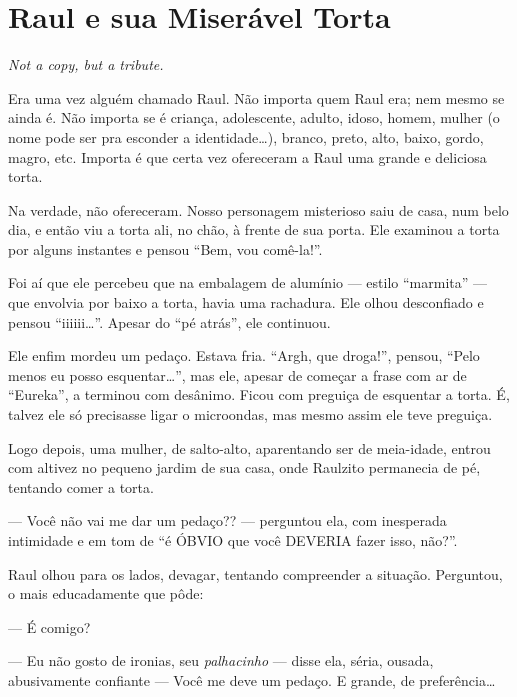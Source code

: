 \chapter{Raul e sua Miserável Torta}

\begin{flushright}
\foreignlanguage{english}{\emph{Not a copy, but a tribute.}}
\end{flushright}

Era uma vez alguém chamado Raul. Não importa quem Raul era; nem mesmo se ainda é. Não importa se é criança, adolescente, adulto, idoso, homem, mulher (o nome pode ser pra esconder a identidade\ldots), branco, preto, alto, baixo, gordo, magro, etc. Importa é que certa vez ofereceram a Raul uma grande e deliciosa torta.

Na verdade, não ofereceram. Nosso personagem misterioso saiu de casa, num belo dia, e então viu a torta ali, no chão, à frente de sua porta. Ele examinou a torta por alguns instantes e pensou ``Bem, vou comê-la!''.

Foi aí que ele percebeu que na embalagem de alumínio --- estilo ``marmita'' --- que envolvia por baixo a torta, havia uma rachadura. Ele olhou desconfiado e pensou ``iiiiii\ldots''. Apesar do ``pé atrás'', ele continuou.

\begin{sloppypar}
Ele enfim mordeu um pedaço. Estava fria. ``Argh, que droga!'', pensou, ``Pelo menos eu posso esquentar\ldots'', mas ele, apesar de começar a frase com ar de ``Eureka'', a terminou com desânimo. Ficou com preguiça de esquentar a torta. É, talvez ele só precisasse ligar o microondas, mas mesmo assim ele teve preguiça.
\end{sloppypar}

Logo depois, uma mulher, de salto-alto, aparentando ser de meia-idade, entrou com altivez no pequeno jardim de sua casa, onde Raulzito permanecia de pé, tentando comer a torta.

--- Você não vai me dar um pedaço?? --- perguntou ela, com inesperada intimidade e em tom de ``é ÓBVIO que você DEVERIA fazer isso, não?''.

Raul olhou para os lados, devagar, tentando compreender a situação. Perguntou, o mais educadamente que pôde:

--- É comigo?

--- Eu não gosto de ironias, seu \emph{palhacinho} --- disse ela, séria, ousada, abusivamente confiante --- Você me deve um pedaço. E grande, de preferência\ldots

